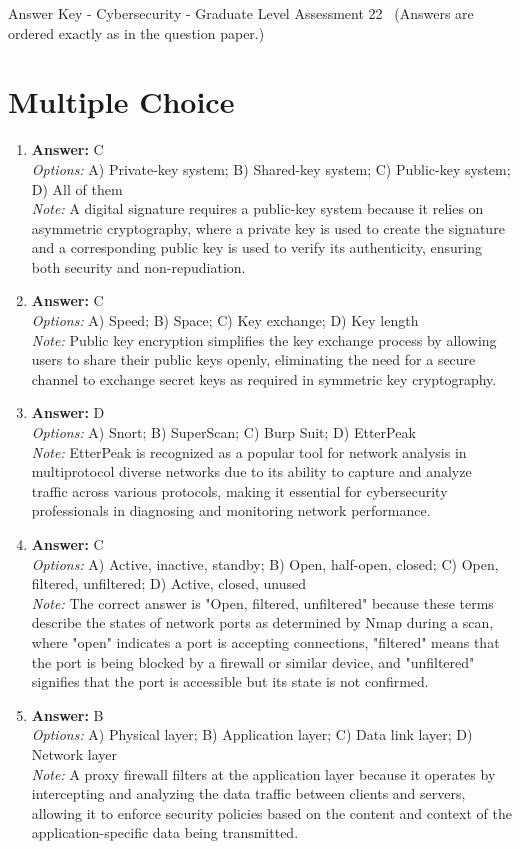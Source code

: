 \documentclass[12pt]{article}
\begin{document}
\begin{center}
Answer Key - Cybersecurity - Graduate Level Assessment 22 \
\small (Answers are ordered exactly as in the question paper.)
\end{center}

\section*{Multiple Choice}
\begin{enumerate}[label=\arabic*.]
\item \textbf{Answer:} C
\\ \textit{Options:} A) Private-key system; B) Shared-key system; C) Public-key system; D) All of them
\\ \textit{Note:} A digital signature requires a public-key system because it relies on asymmetric cryptography, where a private key is used to create the signature and a corresponding public key is used to verify its authenticity, ensuring both security and non-repudiation.
\item \textbf{Answer:} C
\\ \textit{Options:} A) Speed; B) Space; C) Key exchange; D) Key length
\\ \textit{Note:} Public key encryption simplifies the key exchange process by allowing users to share their public keys openly, eliminating the need for a secure channel to exchange secret keys as required in symmetric key cryptography.
\item \textbf{Answer:} D
\\ \textit{Options:} A) Snort; B) SuperScan; C) Burp Suit; D) EtterPeak
\\ \textit{Note:} EtterPeak is recognized as a popular tool for network analysis in multiprotocol diverse networks due to its ability to capture and analyze traffic across various protocols, making it essential for cybersecurity professionals in diagnosing and monitoring network performance.
\item \textbf{Answer:} C
\\ \textit{Options:} A) Active, inactive, standby; B) Open, half-open, closed; C) Open, filtered, unfiltered; D) Active, closed, unused
\\ \textit{Note:} The correct answer is "Open, filtered, unfiltered" because these terms describe the states of network ports as determined by Nmap during a scan, where "open" indicates a port is accepting connections, "filtered" means that the port is being blocked by a firewall or similar device, and "unfiltered" signifies that the port is accessible but its state is not confirmed.
\item \textbf{Answer:} B
\\ \textit{Options:} A) Physical layer; B) Application layer; C) Data link layer; D) Network layer
\\ \textit{Note:} A proxy firewall filters at the application layer because it operates by intercepting and analyzing the data traffic between clients and servers, allowing it to enforce security policies based on the content and context of the application-specific data being transmitted.
\end{enumerate}
\end{document}
